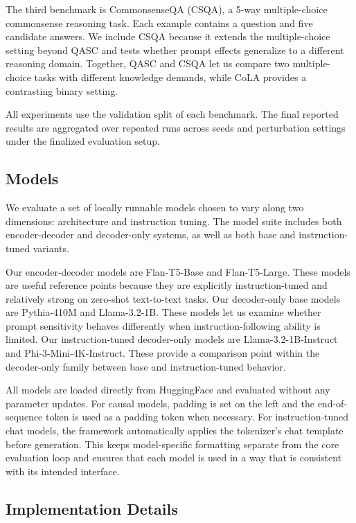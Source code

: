 \documentclass[11pt]{article}
\begin{document}
The third benchmark is CommonsenseQA (CSQA), a 5-way multiple-choice commonsense reasoning task. Each example contains a question and five candidate answers. We include CSQA because it extends the multiple-choice setting beyond QASC and tests whether prompt effects generalize to a different reasoning domain. Together, QASC and CSQA let us compare two multiple-choice tasks with different knowledge demands, while CoLA provides a contrasting binary setting.

All experiments use the validation split of each benchmark. The final reported results are aggregated over repeated runs across seeds and perturbation settings under the finalized evaluation setup.

\subsection{Models}

We evaluate a set of locally runnable models chosen to vary along two dimensions: architecture and instruction tuning. The model suite includes both encoder-decoder and decoder-only systems, as well as both base and instruction-tuned variants.

Our encoder-decoder models are Flan-T5-Base and Flan-T5-Large. These models are useful reference points because they are explicitly instruction-tuned and relatively strong on zero-shot text-to-text tasks. Our decoder-only base models are Pythia-410M and Llama-3.2-1B. These models let us examine whether prompt sensitivity behaves differently when instruction-following ability is limited. Our instruction-tuned decoder-only models are Llama-3.2-1B-Instruct and Phi-3-Mini-4K-Instruct. These provide a comparison point within the decoder-only family between base and instruction-tuned behavior.

All models are loaded directly from HuggingFace and evaluated without any parameter updates. For causal models, padding is set on the left and the end-of-sequence token is used as a padding token when necessary. For instruction-tuned chat models, the framework automatically applies the tokenizer's chat template before generation. This keeps model-specific formatting separate from the core evaluation loop and ensures that each model is used in a way that is consistent with its intended interface.

\subsection{Implementation Details}
\end{document}
